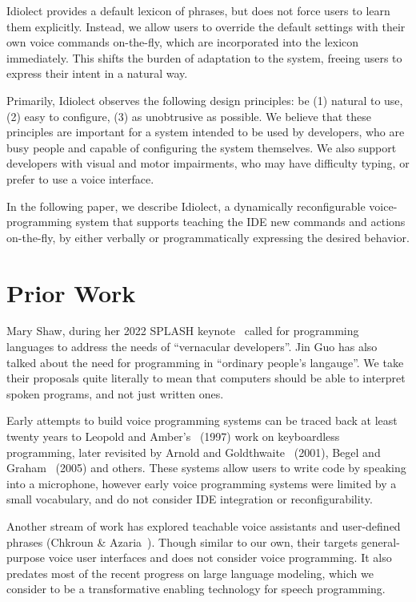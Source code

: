 \documentclass[conference]{IEEEtran}
\begin{document}
Idiolect provides a default lexicon of phrases, but does not force users to learn them explicitly. Instead, we allow users to override the default settings with their own voice commands on-the-fly, which are incorporated into the lexicon immediately. This shifts the burden of adaptation to the system, freeing users to express their intent in a natural way.

Primarily, Idiolect observes the following design principles: be (1) natural to use, (2) easy to configure, (3) as unobtrusive as possible. We believe that these principles are important for a system intended to be used by developers, who are busy people and capable of configuring the system themselves. We also support developers with visual and motor impairments, who may have difficulty typing, or prefer to use a voice interface.

In the following paper, we describe Idiolect, a dynamically reconfigurable voice-programming system that supports teaching the IDE new commands and actions on-the-fly, by either verbally or programmatically expressing the desired behavior.

\section{Prior Work}

Mary Shaw, during her 2022 SPLASH keynote~\cite{shaw2022myths} called for programming languages to address the needs of ``vernacular developers''. Jin Guo has also talked about the need for programming in ``ordinary people's langauge''. We take their proposals quite literally to mean that computers should be able to interpret spoken programs, and not just written ones.

Early attempts to build voice programming systems can be traced back at least twenty years to Leopold and Amber's~\cite{leopold1997keyboardless} (1997) work on keyboardless programming, later revisited by Arnold and Goldthwaite~\cite{arnold2000programming} (2001), Begel and Graham~\cite{begel2005spoken} (2005) and others. These systems allow users to write code by speaking into a microphone, however early voice programming systems were limited by a small vocabulary, and do not consider IDE integration or reconfigurability.

Another stream of work has explored teachable voice assistants and user-defined phrases (Chkroun \& Azaria~\cite{chkroun2019lia}). Though similar to our own, their targets general-purpose voice user interfaces and does not consider voice programming. It also predates most of the recent progress on large language modeling, which we consider to be a transformative enabling technology for speech programming.
\end{document}
